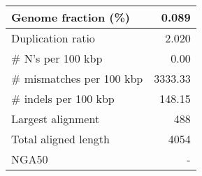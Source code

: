 \documentclass[12pt,a4paper]{article}
\begin{document}
\begin{table}[ht]
\begin{center}
\begin{tabular}{|l*{1}{|r}|}
Genome fraction (\%) & 0.089 \\ \hline
Duplication ratio & 2.020 \\ \hline
\# N's per 100 kbp & 0.00 \\ \hline
\# mismatches per 100 kbp & 3333.33 \\ \hline
\# indels per 100 kbp & 148.15 \\ \hline
Largest alignment & 488 \\ \hline
Total aligned length & 4054 \\ \hline
NGA50 & - \\ \hline
\end{tabular}
\end{center}
\end{table}
\end{document}
